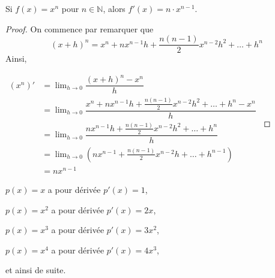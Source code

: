 \documentclass[a4paper,12pt]{article}
\begin{document}
\begin{coro}[label=cor:puissN]
   \tcblower
   Si $f(x)=x^n$ pour $n\in \mathbb{N}$, alors $f'(x)=n\cdot x^{n-1}$.

%   	
%   	
%   	
%
%   	
%   	
%   	
   \begin{proof}
	   On commence par remarquer que 
	   \[(x+h)^n=x^n+nx^{n-1}h+\frac{n(n-1)}{2}x^{n-2}h^2+\ldots+h^n\]
	   Ainsi, 

	   $\begin{aligned}
		   (x^n)'&=\displaystyle{\lim_{h\to0}}\dfrac{(x+h)^n-x^n}{h}\\
			 &=\displaystyle{\lim_{h\to0}}\dfrac{x^n+nx^{n-1}h+\frac{n(n-1)}{2}x^{n-2}h^2+\ldots+h^n-x^n}{h}\\
			 &=\displaystyle{\lim_{h\to0}}\dfrac{nx^{n-1}h+\frac{n(n-1)}{2}x^{n-2}h^2+\ldots+h^n}{h}\\
			 &=\displaystyle{\lim_{h\to0}}\left(nx^{n-1}+\frac{n(n-1)}{2}x^{n-2}h+\ldots+h^{n-1}\right)\\
			&=nx^{n-1}
	   \end{aligned}$

   \end{proof}
\end{coro}

\begin{exemple}
   \tcblower
   $p(x) = x$ a pour dérivée $p'(x) = 1$,
   
   $p(x) = x^2$ a pour dérivée $p'(x) = 2x$,
   
   $p(x) = x^3$ a pour dérivée $p'(x) = 3x^2$,
   
   $p(x) = x^4$ a pour dérivée $p'(x) = 4x^3$,
   
   et ainsi de suite.
\end{exemple}
\end{document}
